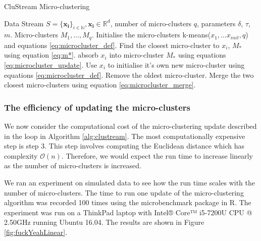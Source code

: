 
\begin{algorithm}
\caption{CluStream Micro-clustering}  
\begin{algorithmic}[1]
\REQUIRE Data Stream $S = \{\boldsymbol{ x_i} \}_{i \in \mathbb{N}}, \boldsymbol{x_i} \in \mathbb{R}^d$, number of micro-clusters $q$, parameters $\delta$, $\tau$, $m$.
\ENSURE Micro-clusters $M_1, \ldots, M_q$.
\STATE Initialise the micro-clusters k-means($x_1, \hdots x_{init},q$) and equations \eqref{eq:microcluster_def}.
 \STATE Find the closest micro-cluster to $x_i$, $M_*$ using equation \eqref{eq:m*}.
   \STATE absorb $x_i$ into micro-cluster $M_*$ using equations \eqref{eq:microcluster_update}.
 \ELSE
 \STATE Use $x_i$ to initialise it's own new micro-cluster using equations \eqref{eq:microcluster_def}.
   \STATE Remove the oldest micro-cluster.
  \ELSE 
   \STATE Merge the two closest micro-clusters using equation \eqref{eq:microcluster_merge}.
  \ENDIF
\ENDIF
\ENDFOR
\end{algorithmic}
\label{alg:clustream}
\end{algorithm}
\subsubsection {The efficiency of updating the micro-clusters}
\label{sec:efficiency-microclusters}
We now consider the computational cost of the micro-clustering update described in the loop in Algorithm \ref{alg:clustream}. The most computationally expensive step is step 3. This step involves computing the Euclidean distance which has complexity $\mathcal{O}(n)$. Therefore, we would expect the run time to increase linearly as the number of micro-clusters is increased.

We ran an experiment on simulated data to see how the run time scales with the number of micro-clusters. The time to run one update of the micro-clustering algorithm was recorded 100 times using the microbenchmark package in R. The experiment was run on a ThinkPad laptop with Intel® Core™ i5-7200U CPU @ 2.50GHz running Ubuntu 16.04. The results are shown in Figure \ref{fig:fuckYeahLinear}.

